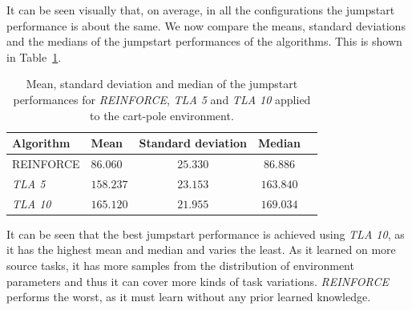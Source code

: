 It can be seen visually that, on average, in all the configurations the jumpstart performance is about the same. We now compare the means, standard deviations and the medians of the jumpstart performances of the algorithms. This is shown in Table~\ref{tab:cartpole:nosparse:stats}.
\begin{table}[htb]
    \centering
    \begin{tabular}{llccc}
    \hline
    Algorithm & Mean & Standard deviation & Median \\
    \hline
       REINFORCE  & $86.060$ & $25.330$ & $86.886$ \\
       \textit{TLA 5} & $158.237$ & $23.153$ & $163.840$ \\
       \textit{TLA 10} & $\bm{165.120}$ & $\bm{21.955}$ & $\bm{169.034}$ \\
    \hline
    \end{tabular}
    \caption{Mean, standard deviation and median of the jumpstart performances for \textit{REINFORCE}, \textit{TLA 5} and \textit{TLA 10} applied to the cart-pole environment.}
    \label{tab:cartpole:nosparse:stats}
\end{table}
It can be seen that the best jumpstart performance is achieved using \textit{TLA 10}, as it has the highest mean and median and varies the least. As it learned on more source tasks, it has more samples from the distribution of environment parameters and thus it can cover more kinds of task variations. \textit{REINFORCE} performs the worst, as it must learn without any prior learned knowledge.

